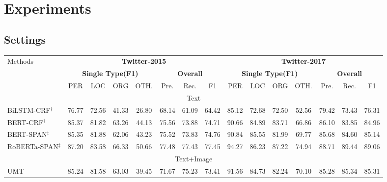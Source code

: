 \documentclass[11pt]{article}
\begin{document}
\section{Experiments}
\subsection{Settings}

\begin{table*}[!]
\small
\setlength\tabcolsep{1.7pt}
\renewcommand{\arraystretch}{1.2}
\centering
\begin{tabular}{lcccccccccccccc}
\toprule
 \multirow{3}{*}{Methods} 
 & \multicolumn{7}{|c|}{\textbf{Twitter-2015}}  &\multicolumn{7}{c}{\textbf{Twitter-2017}}  \\\cline{2-15}
 & \multicolumn{4}{|c|}{\textbf{Single Type(F1)}} & \multicolumn{3}{c|}{\textbf{Overall}} & \multicolumn{4}{c|}{\textbf{Single Type(F1)}} & \multicolumn{3}{c}{\textbf{Overall}}\\
  &\multicolumn{1}{|c}{PER}   & LOC   & ORG  & \multicolumn{1}{c|}{OTH.}  & Pre.   & Rec.   & \multicolumn{1}{c|}{F1} & PER   & LOC   & ORG   & \multicolumn{1}{c|}{OTH.}  & Pre. &Rec. &F1   \\ 
\midrule 
 \multicolumn{15}{c}{ Text}\\
\midrule
BiLSTM-CRF$^\dag$ &\multicolumn{1}{|c}{76.77} & 72.56 & 41.33 & \multicolumn{1}{c|}{26.80} & 68.14 & 61.09 & \multicolumn{1}{c|}{64.42} & 85.12 & 72.68 & 72.50 & \multicolumn{1}{c|}{52.56} & 79.42 & 73.43 & 76.31 \\
BERT-CRF$^\ddag$ & \multicolumn{1}{|c}{85.37} & 81.82 & 63.26 & \multicolumn{1}{c|}{44.13} & 75.56 & 73.88 & \multicolumn{1}{c|}{74.71} & 90.66 & 84.89 & 83.71 & \multicolumn{1}{c|}{66.86} & 86.10 & 83.85 & 84.96  \\
BERT-SPAN$^\ddag$ & \multicolumn{1}{|c}{85.35} & 81.88 & 62.06 & \multicolumn{1}{c|}{43.23} & 75.52 & 73.83 & \multicolumn{1}{c|}{74.76} & 90.84 & 85.55 & 81.99 & \multicolumn{1}{c|}{69.77} & 85.68 & 84.60 & 85.14 \\
RoBERTa-SPAN$^\ddag$ & \multicolumn{1}{|c}{87.20} & 83.58 & 66.33 & \multicolumn{1}{c|}{50.66} & 77.48 & 77.43 & \multicolumn{1}{c|}{77.45} & 94.27 & 86.23 & 87.22 & \multicolumn{1}{c|}{74.94} & 88.71 & 89.44 & 89.06 \\
\midrule 
\multicolumn{15}{c}{ Text+Image}\\
\midrule
UMT & \multicolumn{1}{|c}{85.24} & 81.58 &  63.03 &  \multicolumn{1}{c|}{39.45} &  71.67 &  75.23 &  \multicolumn{1}{c|}{73.41} &  91.56 &  84.73 & 82.24 &  \multicolumn{1}{c|}{70.10} &  85.28 &  85.34 & 85.31 \\

\end{tabular}
\end{table*}
\end{document}
